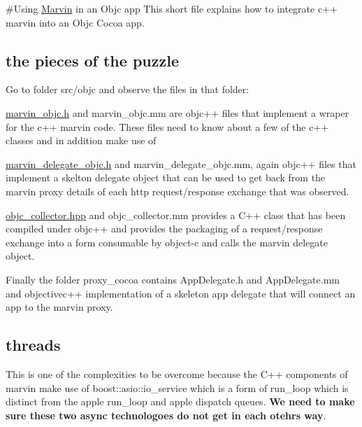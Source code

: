 \#\+Using \hyperlink{namespace_marvin}{Marvin} in an Objc app This short file explains how to integrate c++ marvin into an Objc Cocoa app.

\subsection*{the pieces of the puzzle}

Go to folder {\ttfamily src/objc} and observe the files in that folder\+:


\begin{DoxyItemize}
\item {\ttfamily \hyperlink{marvin__objc_8h_source}{marvin\+\_\+objc.\+h}} and {\ttfamily marvin\+\_\+objc.\+mm} are objc++ files that implement a wraper for the c++ marvin code. These files need to know about a few of the c++ classes and in addition make use of
\begin{DoxyItemize}
\item {\ttfamily \hyperlink{marvin__delegate__objc_8h_source}{marvin\+\_\+delegate\+\_\+objc.\+h}} and {\ttfamily marvin\+\_\+delegate\+\_\+objc.\+mm}, again objc++ files that implement a skelton delegate object that can be used to get back from the marvin proxy details of each http request/response exchange that was observed.
\item {\ttfamily \hyperlink{objc__collector_8hpp_source}{objc\+\_\+collector.\+hpp}} and {\ttfamily objc\+\_\+collector.\+mm} provides a C++ class that has been compiled under objc++ and provides the packaging of a request/response exchange into a form consumable by object-\/c and calls the marvin delegate object.
\end{DoxyItemize}
\item Finally the folder {\ttfamily proxy\+\_\+cocoa} contains {\ttfamily App\+Delegate.\+h} and {\ttfamily App\+Delegate.\+mm} and objectivec++ implementation of a skeleton app delegate that will connect an app to the marvin proxy.
\end{DoxyItemize}

\subsection*{threads}

This is one of the complexities to be overcome because the C++ components of marvin make use of boost\+::asio\+::io\+\_\+service which is a form of run\+\_\+loop which is distinct from the apple run\+\_\+loop and apple dispatch queues. {\bfseries We need to make sure these two async technologoes do not get in each otehrs way}.

